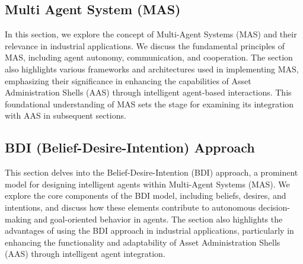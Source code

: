\subsection{Multi Agent System (MAS)}
\begin{tcolorbox}[colback=black!5!white,colframe=black!75!black,
  title=About MAS]
  In this section, we explore the concept of Multi-Agent Systems (MAS) and their relevance in industrial applications. We discuss the fundamental principles of MAS, including agent autonomy, communication, and cooperation. The section also highlights various frameworks and architectures used in implementing MAS, emphasizing their significance in enhancing the capabilities of Asset Administration Shells (AAS) through intelligent agent-based interactions. This foundational understanding of MAS sets the stage for examining its integration with AAS in subsequent sections.
\end{tcolorbox}
\subsection{BDI (Belief-Desire-Intention) Approach}
\begin{tcolorbox}[colback=black!5!white,colframe=black!75!black,
  title=About BDI Approach]
  This section delves into the Belief-Desire-Intention (BDI) approach, a prominent model for designing intelligent agents within Multi-Agent Systems (MAS). We explore the core components of the BDI model, including beliefs, desires, and intentions, and discuss how these elements contribute to autonomous decision-making and goal-oriented behavior in agents. The section also highlights the advantages of using the BDI approach in industrial applications, particularly in enhancing the functionality and adaptability of Asset Administration Shells (AAS) through intelligent agent integration.
\end{tcolorbox}